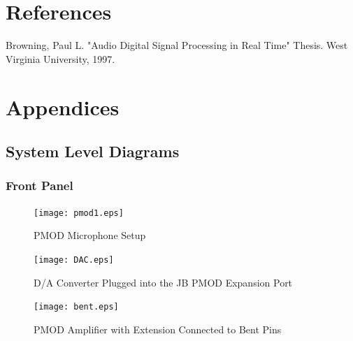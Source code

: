 \documentclass[12pt]{article}
\begin{document}
\paragraph{}


\section{References}
Browning, Paul L. "Audio Digital Signal Processing in Real Time" Thesis. West Virginia University, 1997.
\section{Appendices}
\subsection{System Level Diagrams}
\subsubsection{Front Panel}

\begin{figure}[!htb]
\centering
\texttt{[image: pmod1.eps]}
\caption{PMOD Microphone Setup}
\end{figure}

\begin{figure}[!htb]
\centering
\texttt{[image: DAC.eps]}
\caption{D/A Converter Plugged into the JB PMOD Expansion Port}
\end{figure}

\begin{figure}[!htb]
\centering
\texttt{[image: bent.eps]}
\caption{PMOD Amplifier with Extension Connected to Bent Pins}
\end{figure}
\end{document}
